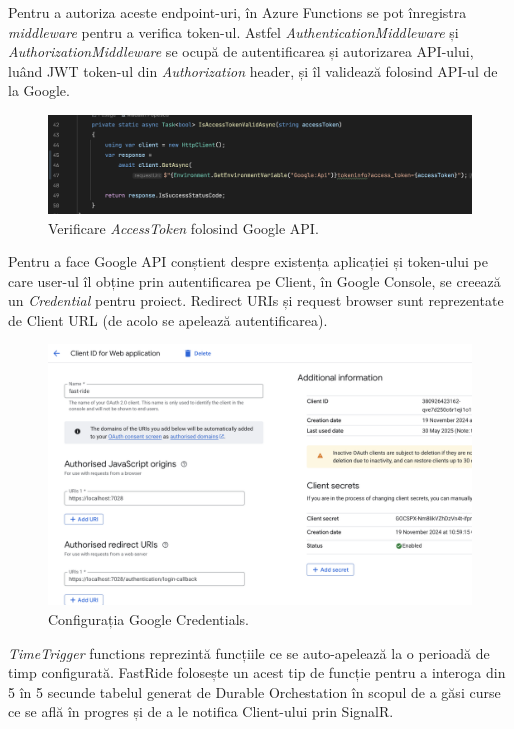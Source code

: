 Pentru a autoriza aceste endpoint-uri, în Azure Functions se pot înregistra \textit{middleware} pentru
a verifica token-ul. Astfel \textit{AuthenticationMiddleware} și \textit{AuthorizationMiddleware} se ocupă de autentificarea
și autorizarea API-ului, luând JWT token-ul din \textit{Authorization} header, și îl validează
folosind API-ul de la Google.

\begin{figure}[H]
    \centering
    \includegraphics[width=16cm]{Assets/GoogleAuthorization.png}
    \caption{Verificare \textit{AccessToken} folosind Google API.}
    \label{fig:GoogleAuthorization}
\end{figure}

Pentru a face Google API conștient despre existența aplicației și token-ului pe care user-ul îl obține
prin autentificarea pe Client, în Google Console, se creează un \textit{Credential} pentru proiect.
Redirect URIs și request browser sunt reprezentate de Client URL (de acolo se apelează autentificarea).

\begin{figure}[H]
    \centering
    \includegraphics[width=14cm]{Assets/GoogleConfig.png}
    \caption{Configurația Google Credentials.}
    \label{fig:GoogleConfig}
\end{figure}

\textit{TimeTrigger} functions reprezintă funcțiile ce se auto-apelează la o perioadă de timp configurată.
FastRide folosește un acest tip de funcție pentru a interoga din 5 în 5 secunde tabelul generat
de Durable Orchestation în scopul de a găsi curse ce se află în progres și de a le notifica
Client-ului prin SignalR.

